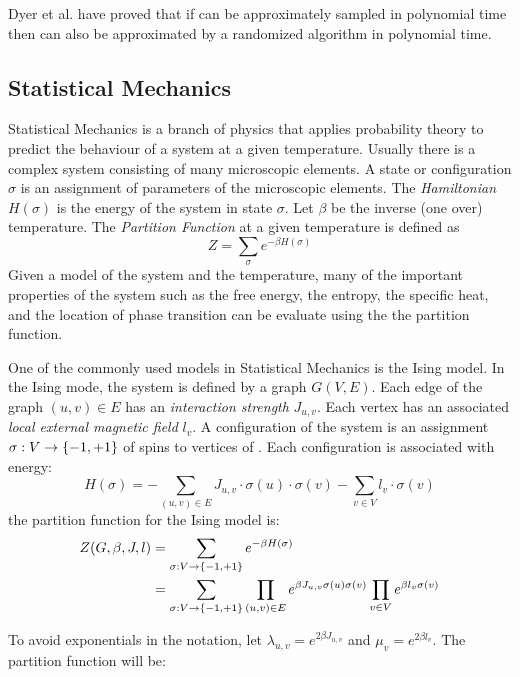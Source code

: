 Dyer et al. \cite{Sampling} have proved that if  can be approximately 
sampled in polynomial time then  
can also be approximated by a randomized algorithm in polynomial time. 

\subsection*{Statistical Mechanics}
Statistical Mechanics is a branch of physics that applies probability theory to
predict the behaviour of a system at a given temperature. Usually there is a complex system
consisting of many microscopic elements. A state or configuration \(\sigma\) is an assignment of
parameters of the microscopic elements. 
The \emph{Hamiltonian} \(H(\sigma)\) is the energy of the system in state \(\sigma\)\@. 
Let \(\beta\) be the inverse (one over) temperature. 
The \emph{Partition Function} at a given temperature is defined as
\[Z=\sum_\sigma e^{-\beta H(\sigma)}\]
Given a model of the system and the temperature,
many of the important properties of the system such as the free energy, the entropy, the specific heat, and the location of phase transition can be evaluate using the the partition function.

One of the commonly used models in Statistical Mechanics is the Ising model. In the Ising mode,
the system is defined by a graph \(G(V,E)\)\@.
Each edge of the graph \((u,v)\in E\) has an {\em interaction strength} \(J_{u,v}\)\@. Each
vertex has an associated \emph{local external magnetic field} \(l_v\)\@.
A configuration of the system  is an assignment \(\sigma: V\to \{{-1,+1}\}\) of spins to
vertices of \mG. Each configuration is associated with energy:
\[H(\sigma)=-\sum_{(u,v)\in E}J_{u,v}\cdot\sigma(u)\cdot\sigma(v)-\sum_{v\in V} l_v\cdot\sigma(v)\]
the partition function for the Ising model is:
\begin{align*}
Z(G,\beta,J,l)&=\sum_{\sigma:V\to\{{-1,+1}\}}e^{-\beta H(\sigma)}\\
&=\sum_{\sigma:V\to\{{-1,+1}\}} \prod_{(u,v)\in E}
e^{\beta J_{u,v}\sigma(u)\sigma(v)} \prod_{v\in V} 
e^{\beta l_v\sigma(v)}
\end{align*}

To avoid exponentials in the notation, let \(\lambda_{u,v}=e^{2\beta J_{u,v}}\) and 
\(\mu_{v}=e^{2\beta l_v}\). The partition function will be:

